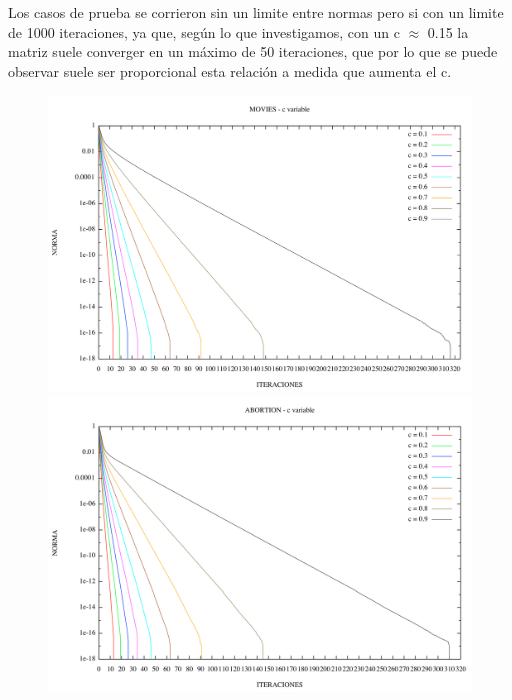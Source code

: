 Los casos de prueba se corrieron sin un limite entre normas pero si con un limite de 1000 iteraciones, ya que, según lo que investigamos, con un c 	$\approx$ 0.15 la matriz suele converger en un máximo de 50 iteraciones, que por lo que se puede observar suele ser proporcional esta relación a medida que aumenta el c.

\begin{figure}
\begin{center}
       \includegraphics[scale=0.5]{imagenes/pagerank_movies_norma.png}
        \includegraphics[scale=0.5]{imagenes/pagerank_abortion_norma.png}
       \end{center}
\end{figure}


